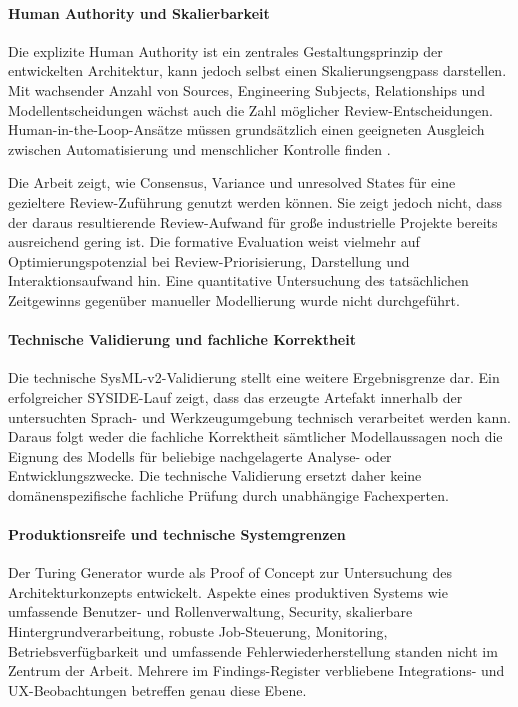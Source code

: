 \paragraph{Human Authority und Skalierbarkeit}

Die explizite Human Authority ist ein zentrales Gestaltungsprinzip der
entwickelten Architektur, kann jedoch selbst einen Skalierungsengpass
darstellen. Mit wachsender Anzahl von Sources, Engineering Subjects,
Relationships und Modellentscheidungen wächst auch die Zahl möglicher
Review-Entscheidungen. Human-in-the-Loop-Ansätze müssen grundsätzlich einen
geeigneten Ausgleich zwischen Automatisierung und menschlicher Kontrolle
finden \cite{MosqueiraRey2023,Lazaros2026}.

Die Arbeit zeigt, wie Consensus, Variance und unresolved States für eine
gezieltere Review-Zuführung genutzt werden können. Sie zeigt jedoch nicht,
dass der daraus resultierende Review-Aufwand für große industrielle Projekte
bereits ausreichend gering ist. Die formative Evaluation weist vielmehr auf
Optimierungspotenzial bei Review-Priorisierung, Darstellung und
Interaktionsaufwand hin. Eine quantitative Untersuchung des tatsächlichen
Zeitgewinns gegenüber manueller Modellierung wurde nicht durchgeführt.

\paragraph{Technische Validierung und fachliche Korrektheit}

Die technische SysML-v2-Validierung stellt eine weitere Ergebnisgrenze dar.
Ein erfolgreicher SYSIDE-Lauf zeigt, dass das erzeugte Artefakt innerhalb der
untersuchten Sprach- und Werkzeugumgebung technisch verarbeitet werden kann.
Daraus folgt weder die fachliche Korrektheit sämtlicher Modellaussagen noch
die Eignung des Modells für beliebige nachgelagerte Analyse- oder
Entwicklungszwecke. Die technische Validierung ersetzt daher keine
domänenspezifische fachliche Prüfung durch unabhängige Fachexperten.

\paragraph{Produktionsreife und technische Systemgrenzen}

Der Turing Generator wurde als Proof of Concept zur Untersuchung des
Architekturkonzepts entwickelt. Aspekte eines produktiven Systems wie
umfassende Benutzer- und Rollenverwaltung, Security, skalierbare
Hintergrundverarbeitung, robuste Job-Steuerung, Monitoring,
Betriebsverfügbarkeit und umfassende Fehlerwiederherstellung standen nicht im
Zentrum der Arbeit. Mehrere im Findings-Register verbliebene Integrations-
und UX-Beobachtungen betreffen genau diese Ebene.

